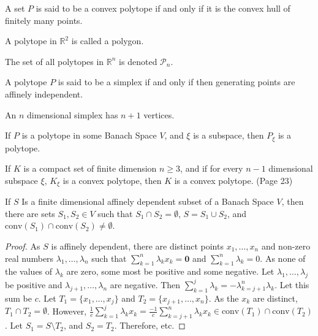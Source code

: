 \documentclass[crop=false,class=book,oneside]{standalone}
\begin{document}
            \begin{definition}
            A set $P$ is said to be a convex polytope if and only if it is the convex hull of finitely many points.
            \end{definition}
            \begin{definition}
            A polytope in $\mathbb{R}^2$ is called a polygon.
            \end{definition}
            \begin{notation}
            The set of all polytopes in $\mathbb{R}^n$ is denoted $\mathscr{P}_n$.
            \end{notation}
            \begin{definition}
            A polytope $P$ is said to be a simplex if and only if then generating points are affinely independent.
            \end{definition}
            \begin{theorem}
            An $n$ dimensional simplex has $n+1$ vertices.
            \end{theorem}
            \begin{theorem}
            If $P$ is a polytope in some Banach Space $V$, and $\xi$ is a subspace, then $P_{\xi}$ is a polytope.
            \end{theorem}
            \begin{theorem}
            If $K$ is a compact set of finite dimension $n\geq 3$, and if for every $n-1$ dimensional subspace $\xi$, $K_{\xi}$ is a convex polytope, then $K$ is a convex polytope. (Page 23)
            \end{theorem}
            \begin{theorem}
            If $S$ Is a finite dimensional affinely dependent subset of a Banach Space $V$, then there are sets $S_1,S_2\in V$ such that $S_1\cap S_2 = \emptyset$, $S=S_1\cup S_2$, and $\textrm{conv}(S_1)\cap \textrm{conv}(S_2) \ne \emptyset$.
            \end{theorem}
            \begin{proof}
            As $S$ is affinely dependent, there are distinct points $x_1,\hdots,x_n$ and non-zero real numbers $\lambda_1,\hdots,\lambda_n$ such that $\sum_{k=1}^{n}\lambda_k x_k= \mathbf{0}$ and $\sum_{k=1}^{n}\lambda_k = 0$. As none of the values of $\lambda_k$ are zero, some most be positive and some negative. Let $\lambda_1,\hdots, \lambda_j$ be positive and $\lambda_{j+1},\hdots, \lambda_n$ are negative. Then $\sum_{k=1}^{j} \lambda_k = - \lambda_{k=j+1}^{n}\lambda_k$. Let this sum be $c$. Let $T_1 = \{x_1,\hdots, x_j\}$ and $T_2=\{x_{j+1},\hdots, x_{n}\}$. As the $x_k$ are distinct, $T_1\cap T_2 = \emptyset$. However, $\frac{1}{c}\sum_{k=1}^{j}\lambda_k x_k = \frac{-1}{c}\sum_{k=j+1}^{n} \lambda_k x_k \in\textrm{conv}(T_1)\cap \textrm{conv}(T_2)$. Let $S_1 = S\setminus T_2$, and $S_2 = T_2$. Therefore, etc.
            \end{proof}
\end{document}
